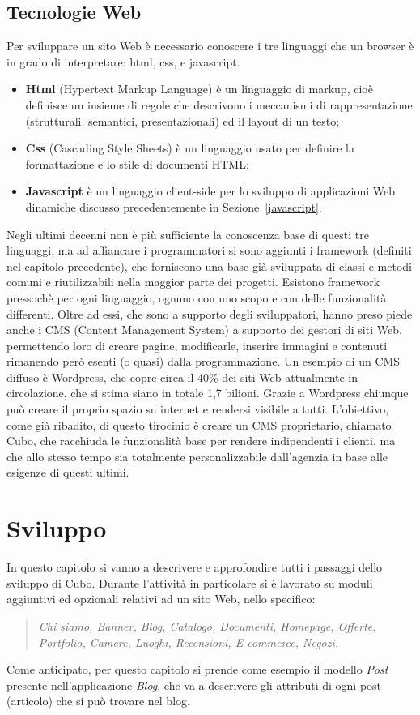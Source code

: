 \documentclass[12pt,a4paper]{article}
\begin{document}
\subsection{Tecnologie Web}
Per sviluppare un sito Web è necessario conoscere i tre linguaggi che un browser è in grado di interpretare: html, css, e javascript.
\begin{itemize}
    \item \textbf{Html} (Hypertext Markup Language) è un linguaggio di markup, cioè definisce un insieme di regole che descrivono i meccanismi di rappresentazione (strutturali, semantici, presentazionali) ed il layout di un testo;
    \item \textbf{Css} (Cascading Style Sheets) è un linguaggio usato per definire la formattazione e lo stile di documenti HTML;
    \item \textbf{Javascript} è un linguaggio client-side per lo sviluppo di applicazioni Web dinamiche discusso precedentemente in Sezione~\ref{javascript}.
\end{itemize}

Negli ultimi decenni non è più sufficiente la conoscenza base di questi tre linguaggi, ma ad affiancare i programmatori si sono aggiunti i framework (definiti nel capitolo precedente), che forniscono una base già sviluppata di classi e metodi comuni e riutilizzabili nella maggior parte dei progetti. Esistono framework pressochè per ogni linguaggio, ognuno con uno scopo e con delle funzionalità differenti.
Oltre ad essi, che sono a supporto degli sviluppatori, hanno preso piede anche i CMS (Content Management System) a supporto dei	gestori di siti Web, permettendo loro di creare pagine, modificarle, inserire immagini e contenuti rimanendo però esenti (o quasi) dalla programmazione.
Un esempio di un CMS diffuso è Wordpress, che copre circa il 40\% dei siti Web attualmente in circolazione, che si stima siano in totale 1,7 bilioni.
Grazie a Wordpress chiunque può creare il proprio spazio su internet e rendersi visibile a tutti.
L’obiettivo, come già ribadito, di questo tirocinio è creare un CMS proprietario, chiamato Cubo, che racchiuda le funzionalità base per rendere indipendenti i clienti, ma che allo stesso tempo sia totalmente personalizzabile dall’agenzia in base alle esigenze di questi ultimi.
\clearpage
\section{Sviluppo}
\label{sviluppo}
In questo capitolo si vanno a descrivere e approfondire tutti i passaggi dello sviluppo di Cubo.
Durante l'attività in particolare si è lavorato su moduli aggiuntivi ed opzionali relativi ad un sito Web, nello specifico:
\begin{quote}
   \textit{ Chi siamo, Banner, Blog, Catalogo, Documenti, Homepage, Offerte, Portfolio, Camere, Luoghi, Recensioni, E-commerce, Negozi.}
\end{quote}
Come anticipato, per questo capitolo si prende come esempio il modello \textit{Post} presente nell’applicazione \textit{Blog}, che va a descrivere gli attributi di ogni post (articolo) che si può trovare nel blog.
\end{document}
